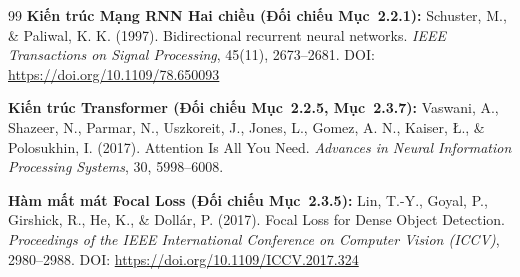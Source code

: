 \begin{thebibliography}{99}
     \textbf{Kiến trúc Mạng RNN Hai chiều (Đối chiếu Mục~2.2.1):} Schuster, M., \& Paliwal, K. K. (1997). Bidirectional recurrent neural networks. \textit{IEEE Transactions on Signal Processing}, 45(11), 2673--2681. DOI: \url{https://doi.org/10.1109/78.650093}
    
     \textbf{Kiến trúc Transformer (Đối chiếu Mục~2.2.5, Mục~2.3.7):} Vaswani, A., Shazeer, N., Parmar, N., Uszkoreit, J., Jones, L., Gomez, A. N., Kaiser, {\L}., \& Polosukhin, I. (2017). Attention Is All You Need. \textit{Advances in Neural Information Processing Systems}, 30, 5998--6008.
    
     \textbf{Hàm mất mát Focal Loss (Đối chiếu Mục~2.3.5):} Lin, T.-Y., Goyal, P., Girshick, R., He, K., \& Doll{\'a}r, P. (2017). Focal Loss for Dense Object Detection. \textit{Proceedings of the IEEE International Conference on Computer Vision (ICCV)}, 2980--2988. DOI: \url{https://doi.org/10.1109/ICCV.2017.324}
\end{thebibliography}